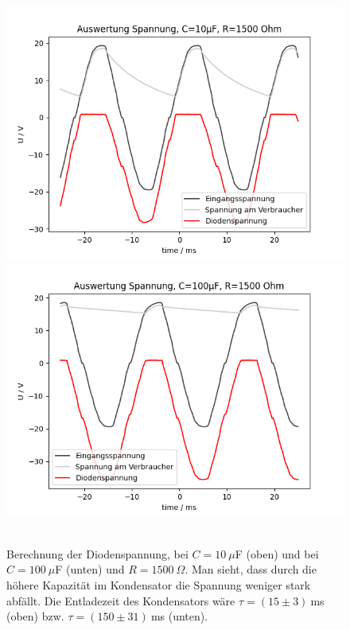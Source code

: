 \documentclass{article}
\begin{document}
\begin{figure}[H]
\caption{Berechnung der Diodenspannung, bei $C = 10~\mu$F (oben) und bei $C = 100~\mu$F (unten) und $R = 1500~\Omega$. Man sieht, dass durch die höhere Kapazität im Kondensator die Spannung weniger stark abfällt. Die Entladezeit des Kondensators wäre $\tau = (15\pm 3)~$ms (oben) bzw. $\tau = (150\pm 31)~$ms (unten).}
\label{fig:grafik_task3_auswertung_10_und_100_R1500}
{\centering
\includegraphics[scale=0.6]{bilder/task3_auswertung_10mu_R1500.png}
\includegraphics[scale=0.6]{bilder/task3_auswertung_100mu_R1500.png}
~
}
\end{figure}
\end{document}
